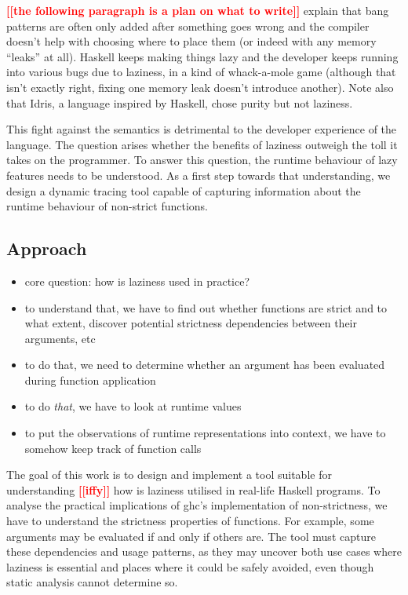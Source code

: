 \documentclass[thesis=B,english]{FITthesis}[2019/12/23]
\newcommand{\todo}[1]{\textcolor{red}{\textbf{[[#1]]}}}
\begin{document}
\todo{the following paragraph is a plan on what to write} explain that bang
patterns are often only added after something goes wrong and the compiler
doesn't help with choosing where to place them (or indeed with any memory
``leaks'' at all). Haskell keeps making things lazy and the developer keeps
running into various bugs due to laziness, in a kind of whack-a-mole game
(although that isn't exactly right, fixing one memory leak doesn't introduce
another). Note also that Idris, a language inspired by Haskell, chose purity
but not laziness.

This fight against the semantics is detrimental to the developer experience of
the language. The question arises whether the benefits of laziness outweigh the
toll it takes on the programmer. To answer this question, the runtime behaviour
of lazy features needs to be understood. As a first step towards that
understanding, we design a dynamic tracing tool capable of capturing
information about the runtime behaviour of non-strict functions.

\subsection{Approach} \label{sec:approach}
\begin{itemize}
	\item core question: how is laziness used in practice?
	\item to understand that, we have to find out whether functions are strict and
		to what extent, discover potential strictness dependencies between their
		arguments, etc
	\item to do that, we need to determine whether an argument has been
		evaluated during function application
	\item to do \textit{that}, we have to look at runtime values
	\item to put the observations of runtime representations into context, we
		have to somehow keep track of function calls
\end{itemize}

The goal of this work is to design and implement a tool suitable for
understanding \todo{iffy} how is laziness utilised in real-life Haskell
programs. To analyse the practical implications of \acrshort{ghc}'s
implementation of non-strictness, we have to understand the strictness
properties of functions. For example, some arguments may be evaluated if and
only if others are. The tool must capture these dependencies and usage
patterns, as they may uncover both use cases where laziness is essential and
places where it could be safely avoided, even though static analysis cannot
determine so.
\end{document}
